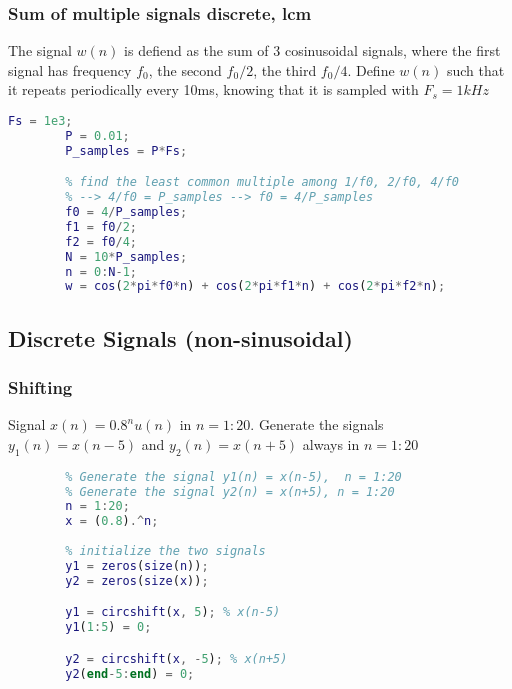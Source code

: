     \subsubsection{Sum of multiple signals discrete, lcm}
    The signal $w(n)$ is defiend as the sum of 3 cosinusoidal signals, where the first signal has frequency $f_0$, the second $f_0/2$, the third $f_0/4$. Define $w(n)$ such that it repeats periodically every 10ms, knowing that it is sampled with $F_s=1kHz$
    \begin{lstlisting}[language=Matlab, escapeinside=`']
        Fs = 1e3;
        P = 0.01;
        P_samples = P*Fs;

        % find the least common multiple among 1/f0, 2/f0, 4/f0
        % --> 4/f0 = P_samples --> f0 = 4/P_samples
        f0 = 4/P_samples;
        f1 = f0/2;
        f2 = f0/4;
        N = 10*P_samples;
        n = 0:N-1;
        w = cos(2*pi*f0*n) + cos(2*pi*f1*n) + cos(2*pi*f2*n);
    \end{lstlisting}

\pagebreak\subsection{Discrete Signals (non-sinusoidal)}

    \subsubsection{Shifting}
    Signal $x(n)=0.8^nu(n)$ in $n=1:20$. Generate the signals $y_1(n)=x(n-5)$ and $y_2(n)=x(n+5)$ always in $n=1:20$
    \begin{lstlisting}[language=Matlab, escapeinside=`']
        % Generate the signal x(n) = (0.8)^n u(n), n = 1:20
        % Generate the signal y1(n) = x(n-5),  n = 1:20
        % Generate the signal y2(n) = x(n+5), n = 1:20
        n = 1:20;
        x = (0.8).^n;
        
        % initialize the two signals
        y1 = zeros(size(n));
        y2 = zeros(size(x));

        y1 = circshift(x, 5); % x(n-5)
        y1(1:5) = 0;

        y2 = circshift(x, -5); % x(n+5)
        y2(end-5:end) = 0;
    \end{lstlisting}

